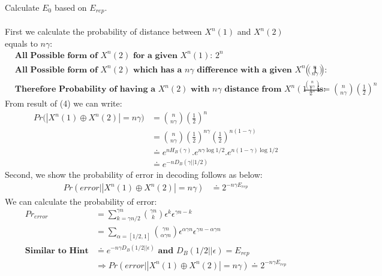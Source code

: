 \documentclass[
  course = {{EE623 Information Theory}},
  quartile = {{4}},
  assignment = 8,
  name = {{Mohammad Mahdi Rahimi}},
  studentnumber = {{20208244}},
  email = {{mahi@kaist.ac.kr}},
  firstexercise = 1
]{aga-homework}
\begin{document}
\newpage

\subexercise Calculate $E_0$ based on $E_{rep}$.
\\\\
First we calculate the probability of distance between $X^n(1)$ and $X^n(2)$ equals to $n\gamma$:
\begin{equation} \label{eq4}
\begin{split}
& \textbf{All Possible form of $X^n(2)$ for a given $X^n(1)$: } 2^n \\
& \textbf{All Possible form of $X^n(2)$ which has a $n\gamma$ difference with a given $X^n(1)$: } \binom{n}{n\gamma}\\
& \textbf{Therefore Probability of having a $X^n(2)$ with $n\gamma$ distance from $X^n(1)$ is: } \frac{\binom{n}{n\gamma}}{2^n} = \binom{n}{n\gamma}\left(\frac{1}{2}\right)^n
\end{split}
\end{equation}
From result of (4) we can write:
\begin{equation} \label{eq5}
\begin{split}
Pr\big(\left|X^n(1) \oplus X^n(2)\right| = n\gamma\big) & = \binom{n}{n\gamma}\left(\frac{1}{2}\right)^n\\
& = \binom{n}{n\gamma}\left(\frac{1}{2}\right)^{n\gamma}\left(\frac{1}{2}\right)^{n(1-\gamma)}\\
& \doteq e^{nH_B(\gamma)} . e^{n\gamma\log1/2} . e^{n(1 - \gamma)\log1/2}\\
& \doteq e^{-nD_B(\gamma || 1/2)}
\end{split}
\end{equation}
Second, we show the probability of error in decoding follows as below:
\begin{equation} \label{eq6}
\begin{split}
Pr\left(error\Big|\left|X^n(1) \oplus X^n(2)\right| = n\gamma \right) & \doteq 2^{-n\gamma E_{rep}}
\end{split}
\end{equation}
We can calculate the probability of error:
\begin{equation} \label{eq7}
\begin{split}
Pr_{error} & = \sum^{\gamma n}_{k = \gamma n / 2} \binom{\gamma n}{k} \epsilon^{k} \epsilon^{\gamma n - k}\\
& = \sum_{\alpha = [1/2, 1]} \binom{\gamma n}{\alpha \gamma n} \epsilon^{\alpha \gamma n} \epsilon^{\gamma n - \alpha \gamma n}\\
\textbf{Similar to Hint} & \doteq e^{-n \gamma D_B(1/2 || \epsilon)} \textbf{ and } D_B(1/2 || \epsilon) = E_{rep}\\
& \Rightarrow Pr\left(error\Big|\left|X^n(1) \oplus X^n(2)\right| = n\gamma \right) \doteq 2^{-n\gamma E_{rep}}
\end{split}
\end{equation}
\end{document}

